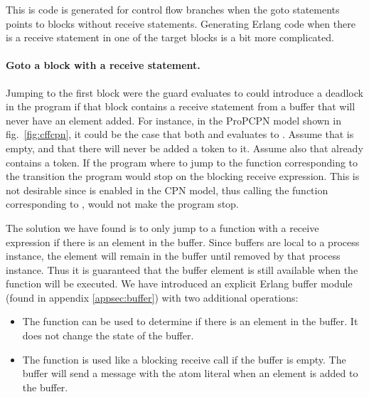 This is code is generated for control flow branches when the goto statements points to blocks without receive statements. Generating Erlang code when there is a receive statement in one of the target blocks is a bit more complicated.

\paragraph{Goto a block with a receive statement.}
Jumping to the first block were the guard evaluates to  could introduce a deadlock in the program if that block contains a receive statement from a buffer that will never have an element added. For instance, in the ProPCPN model shown in fig.~\ref{fig:cffcpn}, it could be the case that both  and  evaluates to . Assume that  is empty, and that there will never be added a token to it. Assume also that  already contains a token. If the program where to jump to the function corresponding to the transition  the program would stop on the blocking receive expression. This is not desirable since  is enabled in the CPN model, thus calling the function corresponding to , would not make the program stop.

The solution we have found is to only jump to a function with a receive expression if there is an element in the buffer. Since buffers are local to a process instance, the element will remain in the buffer until removed by that process instance. Thus it is guaranteed that the buffer element is still available when the function will be executed. We have introduced an explicit Erlang buffer module (found in appendix \ref{appsec:buffer}) with two additional operations:

\begin{itemize}
 \item The function  can be used to determine if there is an element in the buffer. It does not change the state of the buffer. 
 \item The function  is used like a blocking receive call if the buffer is empty. The buffer will send a message with the atom literal  when an element is added to the buffer.
\end{itemize}



